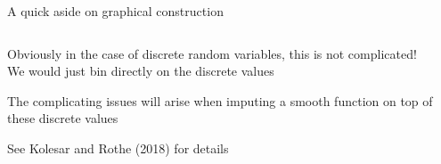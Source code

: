 \documentclass[notes,11pt, aspectratio=169]{beamer}
\newenvironment{wideitemize}{\itemize\addtolength{\itemsep}{10pt}}{\enditemize}
\begin{document}
\begin{frame}{A quick aside on graphical construction}
  \begin{columns}[onlytextwidth, T] %
    \begin{column}{.5\textwidth}
      \begin{wideitemize}
      \item Obviously in the case of discrete random variables, this
        is not complicated! We would just bin directly on the discrete values
      \item The complicating issues will arise when imputing a smooth
        function on top of these discrete values
      \item See Kolesar and Rothe (2018) for details
      \end{wideitemize}
    \end{column}%
    \hfill%
    \begin{column}{.5\textwidth}
    \end{column}%
  \end{columns}
\end{frame}
\end{document}
